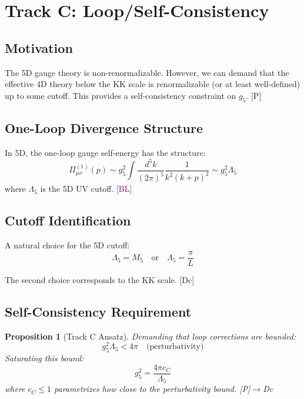 \documentclass[11pt,a4paper]{article}
\newtheorem{proposition}[theorem]{Proposition}
\newcommand{\tagDc}{\textcolor{blue!50!black}{[Dc]}}
\newcommand{\tagP}{\textcolor{green!50!black}{[P]}}
\newcommand{\tagBL}{\textcolor{purple}{[BL]}}
\begin{document}
\section{Track C: Loop/Self-Consistency}

\subsection{Motivation}

The 5D gauge theory is non-renormalizable. However, we can demand that the
effective 4D theory below the KK scale is renormalizable (or at least
well-defined) up to some cutoff. This provides a self-consistency constraint
on $g_5$. \tagP

\subsection{One-Loop Divergence Structure}

In 5D, the one-loop gauge self-energy has the structure:
\begin{equation}
\label{eq:1loop-5d}
\Pi_{\mu\nu}^{(1)}(p) \sim g_5^2 \int \frac{d^5k}{(2\pi)^5} \frac{1}{k^2(k+p)^2} \sim g_5^2 \Lambda_5
\end{equation}
where $\Lambda_5$ is the 5D UV cutoff. \tagBL

\subsection{Cutoff Identification}

A natural choice for the 5D cutoff:
\begin{equation}
\label{eq:cutoff}
\Lambda_5 = M_5 \quad \text{or} \quad \Lambda_5 = \frac{\pi}{L}
\end{equation}

The second choice corresponds to the KK scale. \tagDc

\subsection{Self-Consistency Requirement}

\begin{proposition}[Track C Ansatz]
\label{prop:track-c}
Demanding that loop corrections are bounded:
\begin{equation}
\label{eq:track-c-req}
g_5^2 \Lambda_5 < 4\pi \quad \text{(perturbativity)}
\end{equation}
Saturating this bound:
\begin{equation}
\label{eq:track-c-ansatz}
g_5^2 = \frac{4\pi c_C}{\Lambda_5}
\end{equation}
where $c_C \leq 1$ parametrizes how close to the perturbativity bound. \tagP$\to$Dc
\end{proposition}
\end{document}
